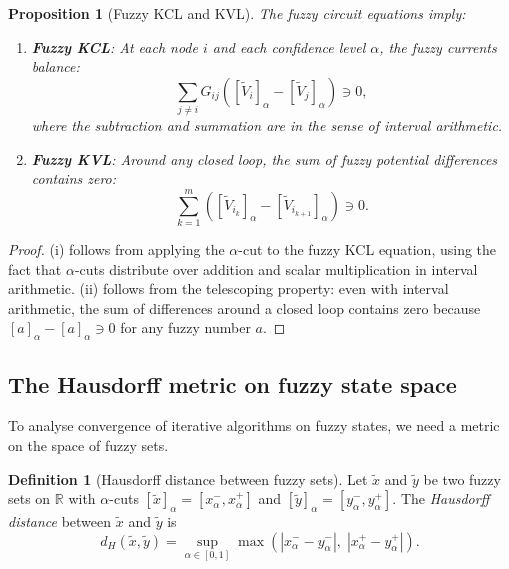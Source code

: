 \documentclass[twocolumn,10pt,a4paper]{article}
\newtheorem{proposition}[theorem]{Proposition}
\theoremstyle{definition}
\newtheorem{definition}[theorem]{Definition}
\theoremstyle{remark}
\newcommand{\R}{\mathbb{R}}
\newcommand{\fuzzy}[1]{\widetilde{#1}}
\begin{document}
\begin{proposition}[Fuzzy KCL and KVL]\label{prop:fuzzy_kirchhoff}
The fuzzy circuit equations imply:
\begin{enumerate}[label=(\roman*)]
\item \textbf{Fuzzy KCL}: At each node $i$ and each confidence level $\alpha$, the fuzzy currents balance:
\begin{equation}
\sum_{j \neq i} G_{ij} \left([\fuzzy{V}_i]_\alpha - [\fuzzy{V}_j]_\alpha\right) \ni 0,
\end{equation}
where the subtraction and summation are in the sense of interval arithmetic.
\item \textbf{Fuzzy KVL}: Around any closed loop, the sum of fuzzy potential differences contains zero:
\begin{equation}
\sum_{k=1}^{m} \left([\fuzzy{V}_{i_k}]_\alpha - [\fuzzy{V}_{i_{k+1}}]_\alpha\right) \ni 0.
\end{equation}
\end{enumerate}
\end{proposition}

\begin{proof}
(i) follows from applying the $\alpha$-cut to the fuzzy KCL equation, using the fact that $\alpha$-cuts distribute over addition and scalar multiplication in interval arithmetic. (ii) follows from the telescoping property: even with interval arithmetic, the sum of differences around a closed loop contains zero because $[a]_\alpha - [a]_\alpha \ni 0$ for any fuzzy number $a$.
\end{proof}

\subsection{The Hausdorff metric on fuzzy state space}

To analyse convergence of iterative algorithms on fuzzy states, we need a metric on the space of fuzzy sets.

\begin{definition}[Hausdorff distance between fuzzy sets]\label{def:hausdorff}
Let $\fuzzy{x}$ and $\fuzzy{y}$ be two fuzzy sets on $\R$ with $\alpha$-cuts $[\fuzzy{x}]_\alpha = [x_\alpha^-, x_\alpha^+]$ and $[\fuzzy{y}]_\alpha = [y_\alpha^-, y_\alpha^+]$. The \emph{Hausdorff distance} between $\fuzzy{x}$ and $\fuzzy{y}$ is
\begin{equation}\label{eq:hausdorff}
d_H(\fuzzy{x}, \fuzzy{y}) = \sup_{\alpha \in [0,1]} \max\left(|x_\alpha^- - y_\alpha^-|, \; |x_\alpha^+ - y_\alpha^+|\right).
\end{equation}
\end{definition}
\end{document}
